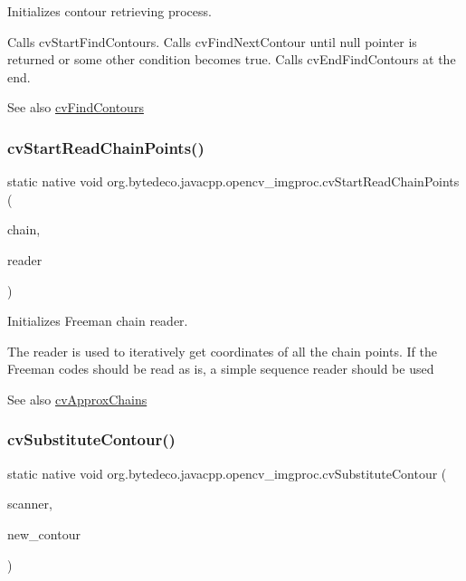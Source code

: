 Initializes contour retrieving process. 

Calls cv\+Start\+Find\+Contours. Calls cv\+Find\+Next\+Contour until null pointer is returned or some other condition becomes true. Calls cv\+End\+Find\+Contours at the end. \begin{DoxySeeAlso}{See also}
\hyperlink{group__imgproc__c_gaa4cfb26bdebe22cd9a83d79b429520ee}{cv\+Find\+Contours} 
\end{DoxySeeAlso}
\mbox{\label{group__imgproc__c_gab6502128f5100580662a79a7326e50e0}} 
\subsubsection{\texorpdfstring{cv\+Start\+Read\+Chain\+Points()}{cvStartReadChainPoints()}}
{\footnotesize\ttfamily static native void org.\+bytedeco.\+javacpp.\+opencv\+\_\+imgproc.\+cv\+Start\+Read\+Chain\+Points (\begin{DoxyParamCaption}\item[{Cv\+Chain}]{chain,  }\item[{Cv\+Chain\+Pt\+Reader}]{reader }\end{DoxyParamCaption})\hspace{0.3cm}{\ttfamily [static]}}



Initializes Freeman chain reader. 

The reader is used to iteratively get coordinates of all the chain points. If the Freeman codes should be read as is, a simple sequence reader should be used \begin{DoxySeeAlso}{See also}
\hyperlink{group__imgproc__c_ga5c874856009b84fc0c3a9533f957516c}{cv\+Approx\+Chains} 
\end{DoxySeeAlso}
\mbox{\label{group__imgproc__c_ga9d72a578b9f29589e8b85b100cd25e01}} 
\subsubsection{\texorpdfstring{cv\+Substitute\+Contour()}{cvSubstituteContour()}}
{\footnotesize\ttfamily static native void org.\+bytedeco.\+javacpp.\+opencv\+\_\+imgproc.\+cv\+Substitute\+Contour (\begin{DoxyParamCaption}\item[{Cv\+Contour\+Scanner}]{scanner,  }\item[{Cv\+Seq}]{new\+\_\+contour }\end{DoxyParamCaption})\hspace{0.3cm}{\ttfamily [static]}}



